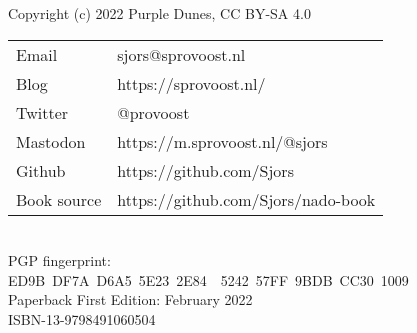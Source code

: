 {\setlength{\parindent}{0cm}
Copyright (c) 2022 Purple Dunes, CC BY-SA 4.0\\

\begin{tabular}{@{} l l }
Email & sjors@sprovoost.nl \\
Blog & https://sprovoost.nl/ \\
Twitter & @provoost \\
Mastodon & https://m.sprovoost.nl/@sjors \\
Github & https://github.com/Sjors \\
Book source & https://github.com/Sjors/nado-book \\
\end{tabular}
\\

PGP fingerprint:\\
ED9B DF7A D6A5 5E23 2E84  5242 57FF 9BDB CC30 1009\\

Paperback First Edition: February 2022\\

ISBN-13-9798491060504\\
}
\newpage
